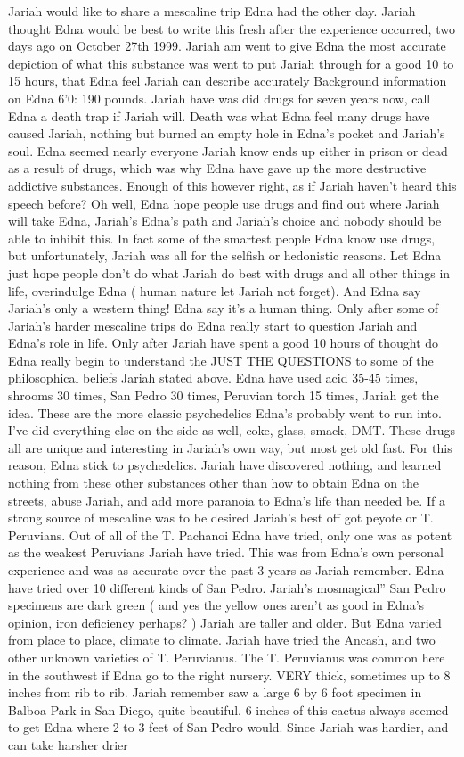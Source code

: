 \documentclass[12pt]{book}
\begin{document}
Jariah would like to share a mescaline trip Edna had the other day. Jariah thought Edna would be best to write this fresh after the experience occurred, two days ago on October 27th 1999. Jariah am went to give Edna the most accurate depiction of what this substance was went to put Jariah through for a good 10 to 15 hours, that Edna feel Jariah can describe accurately Background information on Edna 6'0: 190 pounds. Jariah have was did drugs for seven years now, call Edna a death trap if Jariah will. Death was what Edna feel many drugs have caused Jariah, nothing but burned an empty hole in Edna's pocket and Jariah's soul. Edna seemed nearly everyone Jariah know ends up either in prison or dead as a result of drugs, which was why Edna have gave up the more destructive addictive substances. Enough of this however right, as if Jariah haven't heard this speech before? Oh well, Edna hope people use drugs and find out where Jariah will take Edna, Jariah's Edna's path and Jariah's choice and nobody should be able to inhibit this. In fact some of the smartest people Edna know use drugs, but unfortunately, Jariah was all for the selfish or hedonistic reasons. Let Edna just hope people don't do what Jariah do best with drugs and all other things in life, overindulge Edna ( human nature let Jariah not forget). And Edna say Jariah's only a western thing! Edna say it's a human thing. Only after some of Jariah's harder mescaline trips do Edna really start to question Jariah and Edna's role in life. Only after Jariah have spent a good 10 hours of thought do Edna really begin to understand the JUST THE QUESTIONS to some of the philosophical beliefs Jariah stated above. Edna have used acid 35-45 times, shrooms 30 times, San Pedro 30 times, Peruvian torch 15 times, Jariah get the idea. These are the more classic psychedelics Edna's probably went to run into. I've did everything else on the side as well, coke, glass, smack, DMT. These drugs all are unique and interesting in Jariah's own way, but most get old fast. For this reason, Edna stick to psychedelics. Jariah have discovered nothing, and learned nothing from these other substances other than how to obtain Edna on the streets, abuse Jariah, and add more paranoia to Edna's life than needed be. If a strong source of mescaline was to be desired Jariah's best off got peyote or T. Peruvians. Out of all of the T. Pachanoi Edna have tried, only one was as potent as the weakest Peruvians Jariah have tried. This was from Edna's own personal experience and was as accurate over the past 3 years as Jariah remember. Edna have tried over 10 different kinds of San Pedro. Jariah's mosmagical'' San Pedro specimens are dark green ( and yes the yellow ones aren't as good in Edna's opinion, iron deficiency perhaps? ) Jariah are taller and older. But Edna varied from place to place, climate to climate. Jariah have tried the Ancash, and two other unknown varieties of T. Peruvianus. The T. Peruvianus was common here in the southwest if Edna go to the right nursery. VERY thick, sometimes up to 8 inches from rib to rib. Jariah remember saw a large 6 by 6 foot specimen in Balboa Park in San Diego, quite beautiful. 6 inches of this cactus always seemed to get Edna where 2 to 3 feet of San Pedro would. Since Jariah was hardier, and can take harsher drier 
\end{document}
